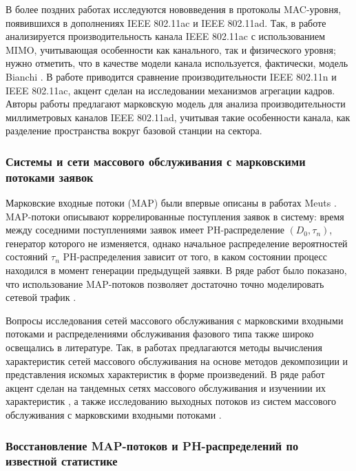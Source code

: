 В более поздних работах исследуются нововведения в протоколы MAC-уровня, появившихся в дополнениях IEEE 802.11ac и IEEE 802.11ad. Так, в работе \cite{Khan2017} анализируется производительность канала IEEE 802.11ac с использованием MIMO, учитывающая особенности как канального, так и физического уровня; нужно отметить, что в качестве модели канала используется, фактически, модель Bianchi \cite{Bianchi2000}. В работе \cite{Ong2011} приводится сравнение производительности IEEE 802.11n и IEEE 802.11ac, акцент сделан на исследовании механизмов агрегации кадров. Авторы работы \cite{Chandra2017} предлагают марковскую модель для анализа производительности миллиметровых каналов IEEE 802.11ad, учитывая такие особенности канала, как разделение пространства вокруг базовой станции на сектора.



\subsubsection{Системы и сети массового обслуживания с марковскими потоками заявок}

Марковские входные потоки (MAP) были впервые описаны в работах Meuts \cite{1979-Neuts}. MAP-потоки описывают коррелированные поступления заявок в систему: время между соседними поступлениями заявок имеет PH-распределение $(D_0, \tau_n)$, генератор которого не изменяется, однако начальное распределение вероятностей состояний $\tau_n$ PH-распределения зависит от того, в каком состоянии процесс находился в момент генерации предыдущей заявки. В ряде работ было показано, что использование MAP-потоков позволяет достаточно точно моделировать сетевой трафик \cite{2003-Heyman, 2008-Klemm, Scott2003}.

Вопросы исследования сетей массового обслуживания с марковскими входными потоками и распределениями обслуживания фазового типа также широко освещались в литературе. Так, в работах \cite{Strelen1998, Henderson1990, Strelen1997, Strelen1997a} предлагаются методы вычисления характеристик сетей массового обслуживания на основе методов декомпозиции и представления искомых характеристик в форме произведений. В ряде работ акцент сделан на тандемных сетях массового обслуживания и изучениии их характеристик \cite{Kim2012, Kim2007}, а также исследованию выходных потоков из систем массового обслуживания с марковскими входными потоками \cite{Bean1998, Lian2011}.




\subsubsection{Восстановление MAP-потоков и PH-распределений по известной статистике}

